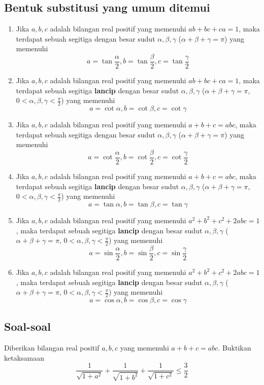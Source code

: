 \documentclass[11pt]{scrartcl}
\begin{document}
\subsection{Bentuk substitusi yang umum ditemui}
\begin{enumerate}
    \item Jika $a, b, c$ adalah bilangan real positif yang memenuhi $ab + bc + ca = 1$, maka terdapat sebuah segitiga dengan besar sudut $\alpha, \beta, \gamma$ ($\alpha + \beta + \gamma = \pi$) yang memenuhi \[a = \tan{\dfrac{\alpha}{2}}, b = \tan{\dfrac{\beta}{2}}, c = \tan{\dfrac{\gamma}{2}}\]
    \item Jika $a, b, c$ adalah bilangan real positif yang memenuhi $ab + bc + ca = 1$, maka terdapat sebuah segitiga \textbf{lancip} dengan besar sudut $\alpha, \beta, \gamma$ ($\alpha + \beta + \gamma = \pi$, $0 < \alpha, \beta, \gamma < \frac{\pi}{2}$) yang memenuhi \[a = \cot{\alpha}, b = \cot{\beta}, c = \cot{\gamma}\]
    \item Jika $a, b, c$ adalah bilangan real positif yang memenuhi $a + b + c = abc$, maka terdapat sebuah segitiga dengan besar sudut $\alpha, \beta, \gamma$ ($\alpha + \beta + \gamma = \pi$) yang memenuhi \[a = \cot{\dfrac{\alpha}{2}}, b = \cot{\dfrac{\beta}{2}}, c = \cot{\dfrac{\gamma}{2}}\]
    \item Jika $a, b, c$ adalah bilangan real positif yang memenuhi $a + b + c = abc$, maka terdapat sebuah segitiga \textbf{lancip} dengan besar sudut $\alpha, \beta, \gamma$ ($\alpha + \beta + \gamma = \pi$, $0 < \alpha, \beta, \gamma < \frac{\pi}{2}$) yang memenuhi \[a = \tan{\alpha}, b = \tan{\beta}, c = \tan{\gamma}\]
    \item Jika $a, b, c$ adalah bilangan real positif yang memenuhi $a^2 + b^2 + c^2 + 2abc = 1$, maka terdapat sebuah segitiga \textbf{lancip} dengan besar sudut $\alpha, \beta, \gamma$ ($\alpha + \beta + \gamma = \pi$, $0 < \alpha, \beta, \gamma < \frac{\pi}{2}$) yang memenuhi \[a = \sin{\dfrac{\alpha}{2}}, b = \sin{\dfrac{\beta}{2}}, c = \sin{\dfrac{\gamma}{2}}\]
    \item Jika $a, b, c$ adalah bilangan real positif yang memenuhi $a^2 + b^2 + c^2 + 2abc = 1$, maka terdapat sebuah segitiga \textbf{lancip} dengan besar sudut $\alpha, \beta, \gamma$ ($\alpha + \beta + \gamma = \pi$, $0 < \alpha, \beta, \gamma < \frac{\pi}{2}$) yang memenuhi \[a = \cos{\alpha}, b = \cos{\beta}, c = \cos{\gamma}\]
\end{enumerate}
\subsection{Soal-soal}
\begin{problem}
    Diberikan bilangan real positif $a, b, c$ yang memenuhi $a + b + c = abc$. Buktikan ketaksamaan \[\dfrac{1}{\sqrt{1 + a^2}} + \dfrac{1}{\sqrt{1 + b^2}} + \dfrac{1}{\sqrt{1 + c^2}} \leq \dfrac{3}{2}\]
\end{problem}
\end{document}
